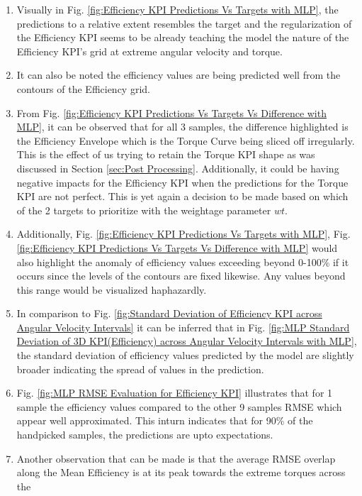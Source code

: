 \documentclass{report} %
\begin{document}
\begin{enumerate}[nosep]
    \item Visually in Fig. \ref{fig:Efficiency KPI Predictions Vs Targets with MLP}, the predictions to a relative extent resembles the target and the regularization 
    of the Efficiency \ac{KPI} seems to be already teaching the model the nature of the Efficiency \ac{KPI}'s grid at extreme angular velocity and torque. 
    \item It can also be noted the efficiency values are being predicted well from the contours of the Efficiency grid.
    \item From Fig. \ref{fig:Efficiency KPI Predictions Vs Targets Vs Difference with MLP}, it can be observed that for all 3 samples, the difference highlighted is 
    the Efficiency Envelope which is the Torque Curve being sliced off irregularly. This is the effect of us trying to retain the Torque \ac{KPI} shape as was 
    discussed in Section \ref{sec:Post Processing}.
    Additionally, it could be having negative impacts for the Efficiency \ac{KPI} when the predictions for the Torque \ac{KPI} are not perfect.
    This is yet again a decision to be made based on which of the 2 targets to prioritize with the weightage parameter \textit{$wt$}. 
    \item Additionally, Fig. \ref{fig:Efficiency KPI Predictions Vs Targets with MLP}, Fig. \ref{fig:Efficiency KPI Predictions Vs Targets Vs Difference with MLP} would also 
    highlight the anomaly of efficiency values exceeding beyond 0-100\% if it occurs since the levels of the contours are fixed likewise. 
    Any values beyond this range would be visualized haphazardly.
    \item In comparison to Fig. \ref{fig:Standard Deviation of Efficiency KPI across Angular Velocity Intervals} it can be inferred that in Fig. 
    \ref{fig:MLP Standard Deviation of 3D KPI(Efficiency) across Angular Velocity Intervals with MLP}, the standard deviation of efficiency values predicted by the model 
    are slightly broader indicating the spread of values in the prediction.
    \item Fig. \ref{fig:MLP RMSE Evaluation for Efficiency KPI} illustrates that for 1 sample the efficiency values compared to the other 9 samples \ac{RMSE} which appear 
    well approximated. This inturn indicates that for 90\% of the handpicked samples, the predictions are upto expectations.
    \item Another observation that can be made is that the average \ac{RMSE} overlap along the Mean Efficiency is at its peak towards the extreme torques across the 

\end{enumerate}
\end{document}
